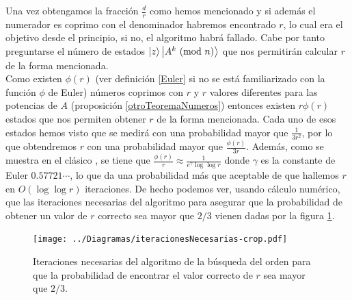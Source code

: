 \documentclass[11pt, spanish]{report}
\numberwithin{equation}{section}
\numberwithin{defin}{section}
\begin{document}
Una vez obtengamos la fracción $\frac{d}{r}$ como hemos mencionado y si además el numerador es coprimo con el denominador habremos encontrado $r$, lo cual era el objetivo desde el principio, si no, el algoritmo habrá fallado. Cabe por tanto preguntarse el número de estados $\ket{z}\ket{A^k\ \text{(mod }n)}$ que nos permitirán calcular $r$ de la forma mencionada.\\

Como existen $\phi(r)$ (ver definición \ref{Euler} si no se está familiarizado con la función $\phi$ de Euler) números coprimos con $r$ y $r$ valores diferentes para las potencias de $A$ (proposición \ref{otroTeoremaNumeros}) entonces existen $r\phi(r)$ estados que nos permiten obtener $r$ de la forma mencionada. Cada uno de esos estados hemos visto que se medirá con una probabilidad mayor que $\frac{1}{3r^2}$, por lo que obtendremos $r$ con una probabilidad mayor que $\frac{\phi(r)}{3r}$. Además, como se muestra en el clásico \cite{hardy1979introduction}, se tiene que $\frac{\phi(r)}{r}\approx \frac{1}{e^\gamma\log\log r}$ donde $\gamma$ es la constante de Euler $0.57721\cdots$, lo que da una probabilidad más que aceptable\footnotemark{} de que hallemos $r$ en $O(\log\log r)$ iteraciones. De hecho podemos ver, usando cálculo numérico, que las iteraciones necesarias del algoritmo para asegurar que la probabilidad de obtener un valor de $r$ correcto sea mayor que $2/3$ vienen dadas por la figura \ref{probs}.


\begin{figure}
\begin{center}
\texttt{[image: ../Diagramas/iteracionesNecesarias-crop.pdf]}
\end{center}
\caption{Iteraciones necesarias del algoritmo de la búsqueda del orden para que la probabilidad de encontrar el valor correcto de $r$ sea mayor que $2/3$.}\label{probs}
\end{figure}
\end{document}
